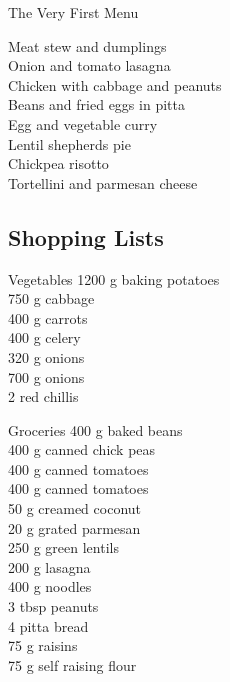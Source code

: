 
    
		\begin{menu}{The Very First Menu}

    Meat stew and dumplings\\
    Onion and tomato lasagna\\
    Chicken with cabbage and peanuts\\
    Beans and fried eggs in pitta\\
    Egg and vegetable curry\\
    Lentil shepherds pie\\
    Chickpea risotto\\
    Tortellini and parmesan cheese\\
    
    \subsection*{Shopping Lists}
      \begin{shoppinglist}{Vegetables}
      1200 g baking potatoes \\ 
      750 g cabbage \\ 
      400 g carrots \\ 
      400 g celery \\ 
      320 g onions \\ 
      700 g onions \\ 
      2  red chillis \\ 
      \end{shoppinglist}%
      \begin{shoppinglist}{Groceries}
      400 g baked beans \\ 
      400 g canned chick peas \\ 
      400 g canned tomatoes \\ 
      400 g canned tomatoes \\ 
      50 g creamed coconut \\ 
      20 g grated parmesan \\ 
      250 g green lentils \\ 
      200 g lasagna \\ 
      400 g noodles \\ 
      3 tbsp peanuts \\ 
      4  pitta bread \\ 
      75 g raisins \\ 
      75 g self raising flour \\ 

\end{shoppinglist}
\end{menu}
